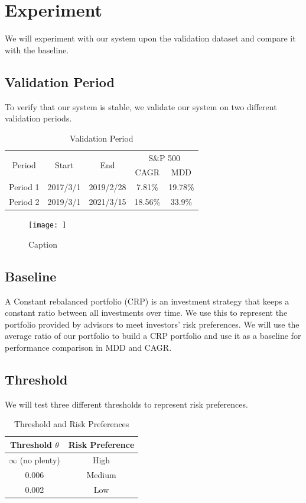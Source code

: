 \section{Experiment}
We will experiment with our system upon the validation dataset and compare it with the baseline.
\subsection{Validation Period}
To verify that our system is stable, we validate our system on two different validation periods. 
\begin{table}[htb]
    \centering
    \begin{tabular}{|c|c|c|c|c|}
    \hline
    \multirow{2}{*}{Period} &
    \multirow{2}{*}{Start} &
    \multirow{2}{*}{End} &
    \multicolumn{2}{c|}{S\&P 500} \\ 
    \cline{4-5} &{} &{} & CAGR & MDD \\ \hline
    Period 1 & 2017/3/1 & 2019/2/28 & 7.81\% & 19.78\% \\ \hline
    Period 2 & 2019/3/1 & 2021/3/15 & 18.56\% & 33.9\% \\    
    \hline
    \end{tabular}
    \caption{Validation Period}
    \label{tab:validation_period}
\end{table}
\begin{figure}
    \centering
    \texttt{[image: ]}
    \caption{Caption}
    \label{fig:my_label}
\end{figure}



\subsection{Baseline}
A Constant rebalanced portfolio (CRP) is an investment strategy that keeps a constant ratio between all investments over time. We use this to represent the portfolio provided by advisors to meet investors' risk preferences. We will use the average ratio of our portfolio to build a CRP portfolio and use it as a baseline for performance comparison in MDD and CAGR.
\subsection{Threshold}
We will test three different thresholds to represent risk preferences.  
\begin{table}[htb]
    \centering
    \begin{tabular}{|c|c|}
    \hline \hline
    Threshold $\theta$ & Risk Preference \\ \hline
    $\infty$  (no plenty) & High \\ \hline
    0.006 & Medium      \\ \hline
    0.002 & Low      \\ \hline    
    \hline
    \end{tabular}
    \caption{Threshold and Risk Preferences}
    \label{tab:threshold}
\end{table}
